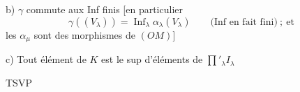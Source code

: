 {b) $\gamma$ commute aux Inf finis [en particulier
\[
\gamma((V_\lambda))=\mathop{\operatorname{Inf}}_\lambda\alpha_\lambda(V_\lambda)\qquad\text{(Inf en fait fini)}\ ;\ \text{et}
\]
les $\alpha_\mu$ sont des morphismes de $(OM)$]

c) Tout élément de $K$ est le sup d'éléments de $\prod'_\lambda I_\lambda$

TSVP}
